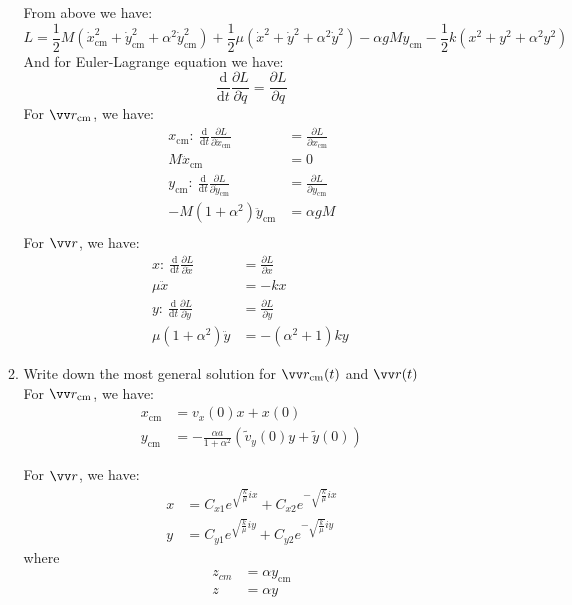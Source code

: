 \documentclass{article}
\newcommand{\de}{\mathrm{d}}
\begin{document}
\begin{enumerate}
\begin{enumerate}
        From above we have:
        \[
        L = \frac{1}{2}M (\dot x_\text{cm}^2 + \dot y_\text{cm}^2 + \alpha^2 \dot y_\text{cm}^2) + \frac{1}{2}\mu (\dot x^2 + \dot y^2 + \alpha^2 \dot y^2) - \alpha g M y_\text{cm} - \frac{1}{2} k (x^2 + y^2 + \alpha^2 y^2)
        \]
        And for Euler-Lagrange equation we have:
        \[
        \frac{\de}{\de t} \frac{\partial L}{\partial \dot q} = \frac{\partial L}{\partial q}
        \]
        For $\vv r_\text{cm}$, we have:
        \begin{align*}
            x_\text{cm}: \ \frac{\de}{\de t} \frac{\partial L}{\partial \dot x_\text{cm}} &= \frac{\partial L}{\partial x_\text{cm}} \\
                           M\ddot x_\text{cm} &= 0\\
            y_\text{cm}: \ \frac{\de}{\de t} \frac{\partial L}{\partial \dot y_\text{cm}} &= \frac{\partial L}{\partial y_\text{cm}} \\
                           -M(1 + \alpha^2)\ddot y_\text{cm} &= \alpha g M\\
        \end{align*}
        For $\vv r$, we have:
        \begin{align*}
            x: \ \frac{\de}{\de t} \frac{\partial L}{\partial \dot x} &= \frac{\partial L}{\partial x} \\
                           \mu\ddot x &= -kx\\
            y: \ \frac{\de}{\de t} \frac{\partial L}{\partial \dot y} &= \frac{\partial L}{\partial y} \\
                           \mu(1+\alpha^2)\ddot y &= - (\alpha^2 + 1)ky\
        \end{align*}

        \item Write down the most general solution for $\vv r_\text{cm}(t)$ and $\vv r (t)$\\

        For $\vv r_\text{cm}$, we have:
        \begin{align*}
            x_\text{cm} &= v_x(0) x + x(0) \\
            y_\text{cm} &= -\frac{\alpha a}{1+\alpha^2}(\tilde v_y(0)y + \tilde y(0))
        \end{align*}

        For $\vv r$, we have:
        \begin{align*}
            x &= C_{x1} e^{\sqrt{\frac{k}{\mu}}ix} + C_{x2} e^{-\sqrt{\frac{k}{\mu}}ix}\\
            y &= C_{y1} e^{\sqrt{\frac{k}{\mu}}iy} + C_{y2} e^{-\sqrt{\frac{k}{\mu}}iy}
        \end{align*}
        where 
        \begin{align*}
            z_{cm} &= \alpha y_\text{cm} \\
            z &= \alpha y 
        \end{align*}




\end{enumerate}
\end{enumerate}
\end{document}
